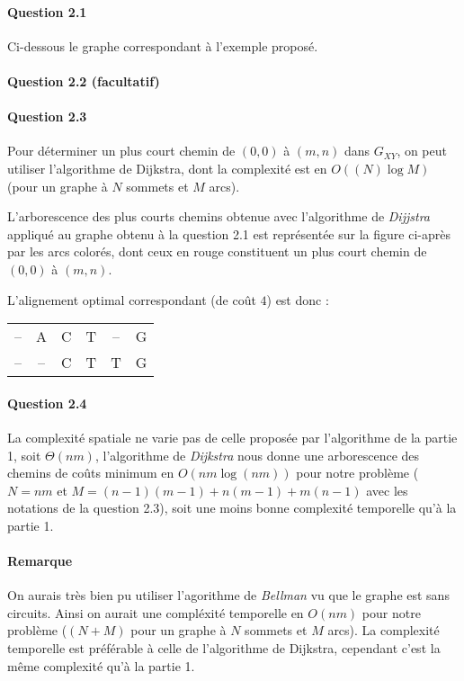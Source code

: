 \paragraph{Question 2.1}
Ci-dessous le graphe correspondant \`a l'exemple propos\'e.


\paragraph{Question 2.2 (facultatif)}

\newpage
\paragraph{Question 2.3}
Pour d\'eterminer un plus court chemin de $(0,0)$ \`a $(m,n)$ dans
$G_{XY}$, on peut utiliser l'algorithme de Dijkstra, dont la
complexit\'e est en $O((N)\log M)$ (pour un graphe \`a $N$ sommets
et $M$ arcs).

L'arborescence des plus courts chemins obtenue avec l'algorithme de
\emph{Dijjstra} appliqu\'e au graphe obtenu \`a la question 2.1 est
repr\'esent\'ee sur la figure ci-apr\`es par les arcs color\'es, dont
ceux en rouge constituent un plus court chemin de $(0,0)$ \`a $(m,n)$.


L'alignement optimal correspondant (de coût $4$) est donc :
\begin{table*}[h]
  \centering
  \begin{tabular}{c|ccccc}
    \hline
    --&A&C&T&--&G\\
    --&--&C&T&T&G\\
    \hline
  \end{tabular}
\end{table*}

\paragraph{Question 2.4}
La complexit\'e spatiale ne varie pas de celle propos\'ee par
l'algorithme de la partie 1, soit $\Theta(nm)$, l'algorithme de
\emph{Dijkstra} nous donne une arborescence des chemins de co\^uts
minimum en $O(nm\log(nm))$ pour notre probl\`eme ($N=nm$ et
$M=(n-1)(m-1)+n(m-1)+m(n-1)$ avec les notations de la question 2.3),
soit une moins bonne complexit\'e temporelle qu'\`a la partie 1.

\paragraph{Remarque}
On aurais tr\`es bien pu utiliser l'agorithme de \emph{Bellman} vu que
le graphe est sans circuits. Ainsi on aurait une compl\'exit\'e
temporelle en $O(nm)$ pour notre probl\`eme \linebreak ($(N+M)$ pour un graphe
\`a $N$ sommets et $M$ arcs). La complexit\'e temporelle est
pr\'ef\'erable \`a celle de l'algorithme de Dijkstra, cependant c'est
la m\^eme complexit\'e qu'\`a la partie 1.
